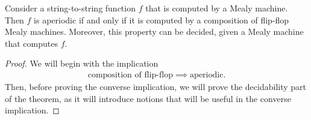 \begin{theorem}\label{thm:aperiodic-mealy}
    Consider a string-to-string function $f$ that is computed by a Mealy machine. Then $f$ is aperiodic if and only if it is computed by a  composition of flip-flop Mealy machines. Moreover, this property can be decided, given a Mealy machine that computes $f$.
\end{theorem}



\begin{proof}
We will begin with the implication 
\begin{align*}
\text{composition of flip-flop} \implies \text{aperiodic}.
\end{align*}
Then, before proving the converse implication, we will prove the decidability part of the theorem, as it will introduce notions  that will be useful in the converse implication.


\end{proof}
